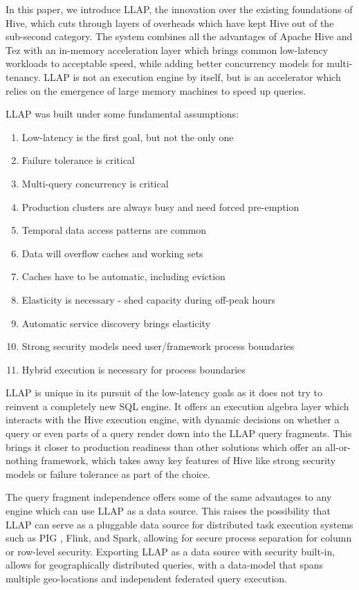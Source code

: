 In this paper, we introduce LLAP, the innovation over the existing foundations of Hive, which cuts through layers of overheads which have kept Hive out of the sub-second category. The system combines all the advantages of Apache Hive and Tez with an in-memory acceleration layer which brings common low-latency workloads to acceptable speed, while adding better concurrency models for multi-tenancy. LLAP is not an execution engine by itself, but is an accelerator which relies on the emergence of large memory machines to speed up queries.

LLAP was built under some fundamental assumptions:
\begin{enumerate}
\item Low-latency is the first goal, but not the only one
\item Failure tolerance is critical 
\item Multi-query concurrency is critical 
\item Production clusters are always busy and need forced pre-emption
\item Temporal data access patterns are common
\item Data will overflow caches and working sets 
\item Caches have to be automatic, including eviction 
\item Elasticity is necessary - shed capacity during off-peak hours
\item Automatic service discovery brings elasticity 
\item Strong security models need user/framework process boundaries 
\item Hybrid execution is necessary for process boundaries
\end{enumerate}

LLAP is unique in its pursuit of the low-latency goals as it does not try to reinvent a completely new SQL engine. It offers an execution algebra layer which interacts with the Hive execution engine, with dynamic decisions on whether a query or even parts of a query render down into the LLAP query fragments. This brings it closer to production readiness than other solutions which offer an all-or-nothing framework, which takes away key features of Hive like strong security models or failure tolerance as part of the choice.

The query fragment independence offers some of the same advantages to any engine which can use LLAP as a data source. This raises the possibility that LLAP can serve as a pluggable data source for 
distributed task execution systems such as PIG \cite{pig}, Flink\cite{flink}, and Spark\cite{spark}, allowing for secure process separation for column or row-level security. Exporting LLAP as a data source with security built-in, allows for geographically distributed queries, with a data-model that spans multiple geo-locations and independent federated query execution.

